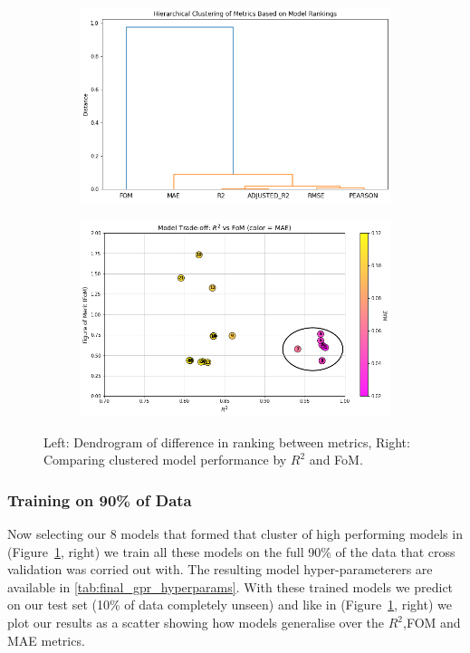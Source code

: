 \documentclass[12pt]{article}
\begin{document}
\begin{figure}[H]
    \centering
    \begin{subfigure}[t]{0.3\textwidth}
        \centering
        \includegraphics[width=\textwidth]{LatexPlots/CV_plots/clustermetrics.png}
    \end{subfigure}
    \hspace{0.03\textwidth}
    \begin{subfigure}[t]{0.3\textwidth}
        \centering
        \includegraphics[width=\textwidth]{LatexPlots/CV_plots/r2vsfom.png}
    \end{subfigure}
    \caption{Left: Dendrogram of difference in ranking between metrics, Right: Comparing clustered model performance by $R^2$ and FoM.}
    \label{fig:CV_sidebyside}
\end{figure}





\subsubsection*{Training on 90\% of Data}
Now selecting our 8 models that formed that cluster of high performing models in (Figure~\ref{fig:CV_sidebyside}, right) we train all these models on the full 90\% of the data that cross validation was corried out with.
The resulting model hyper-parameterers are available in \ref{tab:final_gpr_hyperparams}. With these trained models we predict on our test set (10\% of data completely unseen) and like in (Figure~\ref{fig:CV_sidebyside}, right)
we plot our results as a scatter showing how models generalise over the \(R^2\),FOM and MAE metrics.
\end{document}
